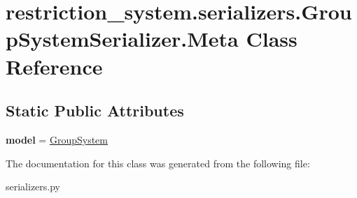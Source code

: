 \hypertarget{classrestriction__system_1_1serializers_1_1GroupSystemSerializer_1_1Meta}{}\section{restriction\+\_\+system.\+serializers.\+Group\+System\+Serializer.\+Meta Class Reference}
\label{classrestriction__system_1_1serializers_1_1GroupSystemSerializer_1_1Meta}
\subsection*{Static Public Attributes}
\begin{DoxyCompactItemize}
\item 
\hypertarget{classrestriction__system_1_1serializers_1_1GroupSystemSerializer_1_1Meta_a0148db844b131a58def510066b4d3013}{}{\bfseries model} = \hyperlink{classrestriction__system_1_1models_1_1GroupSystem}{Group\+System}\label{classrestriction__system_1_1serializers_1_1GroupSystemSerializer_1_1Meta_a0148db844b131a58def510066b4d3013}

\end{DoxyCompactItemize}


The documentation for this class was generated from the following file\+:\begin{DoxyCompactItemize}
\item 
serializers.\+py\end{DoxyCompactItemize}
